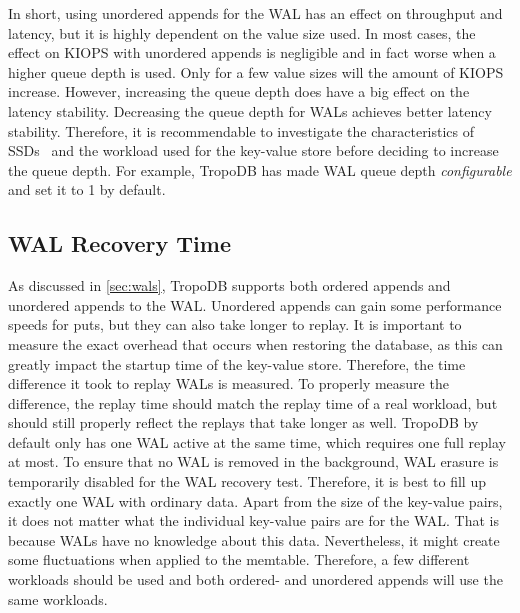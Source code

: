 In short, using unordered appends for the WAL has an effect on throughput and latency, but it is highly dependent on the value size used. In most cases, the effect on KIOPS with unordered appends is negligible and in fact worse when a higher queue depth is used. Only for a few value sizes will the amount of KIOPS increase. However, increasing the queue depth does have a big effect on the latency stability. Decreasing the queue depth for WALs achieves better latency stability.  Therefore, it is recommendable to investigate the characteristics of SSDs~\cite{klimovic2017reflex} and the workload used for the key-value store before deciding to increase the queue depth. For example, TropoDB has made WAL queue depth \textit{configurable} and set it to 1 by default.


\subsection{WAL Recovery Time}
\label{sec:walrec}
As discussed in \autoref{sec:wals}, TropoDB supports both ordered appends and unordered appends to the WAL. Unordered appends can gain some performance speeds for puts, but they can also take longer to replay. It is important to measure the exact overhead that occurs when restoring the database, as this can greatly impact the startup time of the key-value store. Therefore, the time difference it took to replay WALs is measured. To properly measure the difference, the replay time should match the replay time of a real workload, but should still properly reflect the replays that take longer as well. TropoDB by default only has one WAL active at the same time, which requires one full replay at most. To ensure that no WAL is removed in the background, WAL erasure is temporarily disabled for the WAL recovery test. Therefore, it is best to fill up exactly one WAL with ordinary data. Apart from the size of the key-value pairs, it does not matter what the individual key-value pairs are for the WAL. That is because WALs have no knowledge about this data. Nevertheless, it might create some fluctuations when applied to the memtable. Therefore, a few different workloads should be used and both ordered- and unordered appends will use the same workloads.

